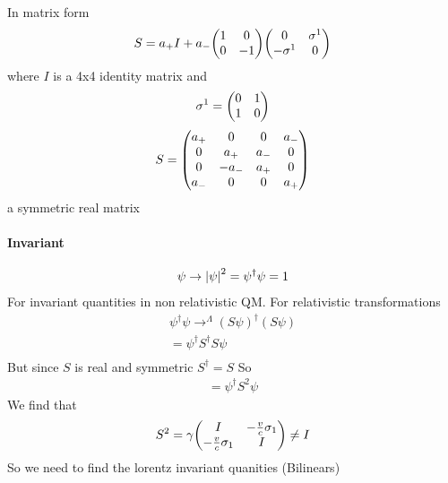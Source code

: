 \documentclass[../main.tex]{subfiles}
\begin{document}
In matrix form 
\begin{align*}
    S = a_+ I + a_- \mqty(1 & 0 \\ 0 & -1) \mqty(0 & \sigma^1 \\ -\sigma^1 & 0)
\end{align*}
where $I$ is a 4x4 identity matrix and
\begin{align*}
    \sigma^1 = \mqty(0 & 1 \\ 1 & 0)
\end{align*}
\begin{align*}
    S = \mqty(a_+ & 0 & 0 & a_- \\ 0 & a_+ & a_- & 0 \\ 0 & -a_- & a_+ & 0 \\ a_- & 0 & 0 & a_+)
\end{align*}
a symmetric real matrix
\paragraph*{Invariant}
\begin{align*}
    \psi \to \abs{\psi}^2 = \psi^\dagger \psi = 1
\end{align*}
For invariant quantities in non relativistic QM. For relativistic transformations
\begin{align*}
    \psi^\dagger \psi \to^\Lambda (S \psi)^\dagger (S\psi) \\
    = \psi^\dagger S^\dagger S \psi \\
\end{align*}
But since $S$ is real and symmetric $S^\dagger = S$ So
\begin{align*}
    = \psi^\dagger S^2 \psi
\end{align*}
We find that
\begin{align*}
    S^2 = \gamma \mqty(I & -\frac{v}{c} \sigma_1 \\ -\frac{v}{c} \sigma_1 & I) \neq I
\end{align*}
So we need to find the lorentz invariant quanities (Bilinears)

\newpage
{}
\end{document}
